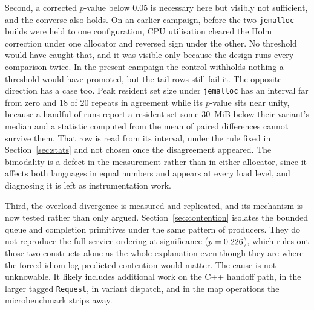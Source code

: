 \documentclass[english,twoside,openright,a4paper,censored,csm,software-track-2020]{HYthesisML}
\begin{document}
Second, a corrected $p$-value below $0.05$ is necessary here but visibly not sufficient, and the
converse also holds. On an earlier campaign, before the two \texttt{jemalloc} builds were held to
one configuration, CPU utilisation cleared the Holm correction under one allocator and reversed
sign under the other. No threshold would have caught that, and it was visible only because the
design runs every comparison twice. In the present campaign the control withholds nothing a
threshold would have promoted, but the tail rows still fail it. The opposite direction has a case
too. Peak resident set size under \texttt{jemalloc} has an interval far from zero and $18$ of $20$
repeats in agreement while its $p$-value sits near unity, because a handful of runs report a
resident set some $30$~MiB below their variant's median and a statistic computed from the mean of
paired differences cannot survive them. That row is read from its interval, under the rule fixed
in Section~\ref{sec:stats} and not chosen once the disagreement appeared. The bimodality is a
defect in the measurement rather than in either allocator, since it affects both languages in
equal numbers and appears at every load level, and diagnosing it is left as instrumentation work.

Third, the overload divergence is measured and replicated, and its mechanism is now tested rather
than only argued. Section~\ref{sec:contention} isolates the bounded queue and completion
primitives under the same pattern of \ContentionProducers{} producers. They do not reproduce the full-service ordering
at significance ($p = 0.226$), which rules out those two constructs alone as the whole
explanation even though they are where the forced-idiom log predicted contention would matter. The
cause is not unknowable. It likely includes additional work on the C++ handoff path, in the larger
tagged \texttt{Request}, in variant dispatch, and in the map operations the microbenchmark strips
away.
\end{document}
